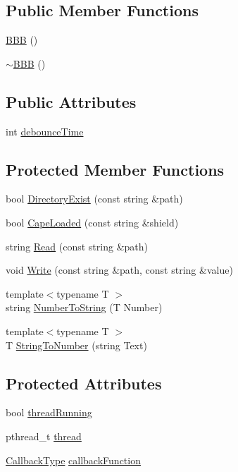 \subsection*{Public Member Functions}
\begin{DoxyCompactItemize}
\item 
\hyperlink{class_hardware_1_1_b_b_b_ab26c0f13cc9488b757e309495ef398d7}{B\+B\+B} ()
\item 
\hyperlink{class_hardware_1_1_b_b_b_a34ee1e17e06e6d229be6d718b9ad1f02}{$\sim$\+B\+B\+B} ()
\end{DoxyCompactItemize}
\subsection*{Public Attributes}
\begin{DoxyCompactItemize}
\item 
int \hyperlink{class_hardware_1_1_b_b_b_a353a2d7d4fbade337e5173b484b20b22}{debounce\+Time}
\end{DoxyCompactItemize}
\subsection*{Protected Member Functions}
\begin{DoxyCompactItemize}
\item 
bool \hyperlink{class_hardware_1_1_b_b_b_adf431d8e0e8899f7aa16c350a2270e79}{Directory\+Exist} (const string \&path)
\item 
bool \hyperlink{class_hardware_1_1_b_b_b_aaf2f732c771eac0b1ee984dbc0bca784}{Cape\+Loaded} (const string \&shield)
\item 
string \hyperlink{class_hardware_1_1_b_b_b_a8b287ded7bcb2cfab361d1fca2b62e9f}{Read} (const string \&path)
\item 
void \hyperlink{class_hardware_1_1_b_b_b_a155cc06f76d82a6b690ce5ea08e7c68e}{Write} (const string \&path, const string \&value)
\item 
{\footnotesize template$<$typename T $>$ }\\string \hyperlink{class_hardware_1_1_b_b_b_ab2fc876590e3b9b482e3224ba617afba}{Number\+To\+String} (T Number)
\item 
{\footnotesize template$<$typename T $>$ }\\T \hyperlink{class_hardware_1_1_b_b_b_a7484c095027594aa5bfde8b56b73be7b}{String\+To\+Number} (string Text)
\end{DoxyCompactItemize}
\subsection*{Protected Attributes}
\begin{DoxyCompactItemize}
\item 
bool \hyperlink{class_hardware_1_1_b_b_b_a0d9d8c56afb37955e0d0c6baf0f418df}{thread\+Running}
\item 
pthread\+\_\+t \hyperlink{class_hardware_1_1_b_b_b_a3ad3fe886705bfc242ef58dc5329166e}{thread}
\item 
\hyperlink{namespace_hardware_a5ba2e4bdfa2bbd8b551b1d5b2a0c61fd}{Callback\+Type} \hyperlink{class_hardware_1_1_b_b_b_a66d583952f3949a732ee15eea81e80e5}{callback\+Function}
\end{DoxyCompactItemize}


